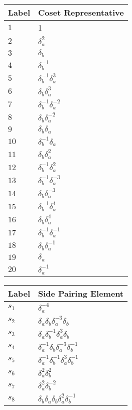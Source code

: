 \documentclass{article}
\begin{document}

\begin{center}
\begin{tabular}{ll}
\toprule
Label & Coset Representative\\
\midrule
$1$ & 1 \\
$2$ & $\delta_a^{2}$ \\
$3$ & $\delta_b^{}$ \\
$4$ & $\delta_b^{-1}$ \\
$5$ & $\delta_b^{-1}\delta_a^{3}$ \\
$6$ & $\delta_b^{}\delta_a^{3}$ \\
$7$ & $\delta_b^{-1}\delta_a^{-2}$ \\
$8$ & $\delta_b^{}\delta_a^{-2}$ \\
$9$ & $\delta_b^{}\delta_a^{}$ \\
$10$ & $\delta_b^{-1}\delta_a^{}$ \\
$11$ & $\delta_b^{}\delta_a^{2}$ \\
$12$ & $\delta_b^{-1}\delta_a^{2}$ \\
$13$ & $\delta_b^{-1}\delta_a^{-3}$ \\
$14$ & $\delta_b^{}\delta_a^{-3}$ \\
$15$ & $\delta_b^{-1}\delta_a^{4}$ \\
$16$ & $\delta_b^{}\delta_a^{4}$ \\
$17$ & $\delta_b^{-1}\delta_a^{-1}$ \\
$18$ & $\delta_b^{}\delta_a^{-1}$ \\
$19$ & $\delta_a^{}$ \\
$20$ & $\delta_a^{-1}$ \\
\bottomrule
\end{tabular}
\hfill
\begin{tabular}{ll}
\toprule
Label & Side Pairing Element\\
\midrule
$s_{1}$ & $\delta_a^{-4}$ \\
$s_{2}$ & $\delta_a^{}\delta_b^{}\delta_a^{-3}\delta_b^{}$ \\
$s_{3}$ & $\delta_a^{}\delta_b^{-1}\delta_a^{3}\delta_b^{}$ \\
$s_{4}$ & $\delta_a^{-1}\delta_b^{}\delta_a^{-3}\delta_b^{-1}$ \\
$s_{5}$ & $\delta_a^{-1}\delta_b^{-1}\delta_a^{3}\delta_b^{-1}$ \\
$s_{6}$ & $\delta_a^{2}\delta_b^{2}$ \\
$s_{7}$ & $\delta_a^{2}\delta_b^{-2}$ \\
$s_{8}$ & $\delta_b^{}\delta_a^{}\delta_b^{}\delta_a^{2}\delta_b^{-1}$ \\

\end{tabular}
\end{center}
\end{document}
